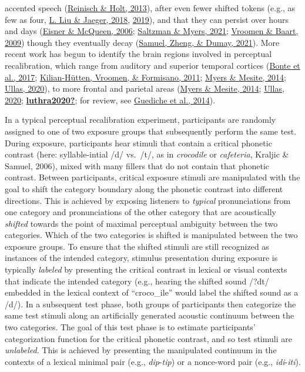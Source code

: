 \documentclass[
  11pt,
  man,floatsintext]{apa6}
\begin{document}
accented speech (\protect\hyperlink{ref-reinisch-holt2013}{Reinisch \& Holt, 2013}), after even fewer shifted tokens (e.g., as few as four, \protect\hyperlink{ref-liu-jaeger2018}{L. Liu \& Jaeger, 2018}, \protect\hyperlink{ref-liu-jaeger2019}{2019}), and that they can persist over hours and days (\protect\hyperlink{ref-eisner-mcqueen2006}{Eisner \& McQueen, 2006}; \protect\hyperlink{ref-saltzman-myers2021}{Saltzman \& Myers, 2021}; \protect\hyperlink{ref-vroomen-baart2009}{Vroomen \& Baart, 2009}) though they eventually decay (\protect\hyperlink{ref-samuel2021}{Samuel, Zheng, \& Dumay, 2021}). More recent work has begun to identify the brain regions involved in perceptual recalibration, which range from auditory and superior temporal cortices (\protect\hyperlink{ref-bonte2017}{Bonte et al., 2017}; \protect\hyperlink{ref-kilianhutten2011}{Kilian-Hütten, Vroomen, \& Formisano, 2011}; \protect\hyperlink{ref-myers-mesite2014}{Myers \& Mesite, 2014}; \protect\hyperlink{ref-ullas2020}{Ullas, 2020}), to more frontal and parietal areas (\protect\hyperlink{ref-myers-mesite2014}{Myers \& Mesite, 2014}; \protect\hyperlink{ref-ullas2020}{Ullas, 2020}; \protect\hyperlink{ref-luthra2020}{\textbf{luthra2020?}}; for review, see \protect\hyperlink{ref-guediche2014}{Guediche et al., 2014}).

In a typical perceptual recalibration experiment, participants are randomly assigned to one of two exposure groups that subsequently perform the same test. During exposure, participants hear stimuli that contain a critical phonetic contrast (here: syllable-intial /d/ vs.~/t/, as in \emph{croco\emph{d}ile} or \emph{cafe\emph{t}eria}, Kraljic \& Samuel, 2006), mixed with many fillers that do not contain that phonetic contrast. Between participants, critical exposure stimuli are manipulated with the goal to shift the category boundary along the phonetic contrast into different directions. This is achieved by exposing listeners to \emph{typical} pronunciations from one category and pronunciations of the other category that are acoustically \emph{shifted} towards the point of maximal perceptual ambiguity between the two categories. Which of the two categories is shifted is manipulated between the two exposure groups. To ensure that the shifted stimuli are still recognized as instances of the intended category, stimulus presentation during exposure is typically \emph{labeled} by presenting the critical contrast in lexical or visual contexts that indicate the intended category (e.g., hearing the shifted sound /?dt/ embedded in the lexical context of ``croco\_ile'' would label the shifted sound as a /d/). In a subsequent test phase, both groups of participants then categorize the same test stimuli along an artificially generated acoustic continuum between the two categories. The goal of this test phase is to estimate participants' categorization function for the critical phonetic contrast, and so test stimuli are \emph{unlabeled}. This is achieved by presenting the manipulated continuum in the contexts of a lexical minimal pair (e.g., \emph{dip}-\emph{tip}) or a nonce-word pair (e.g., \emph{idi}-\emph{iti}).
\end{document}
